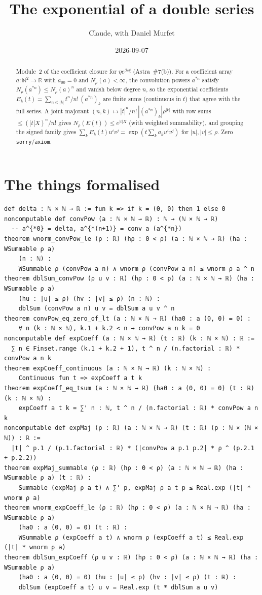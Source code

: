 \documentclass[11pt]{article}
\title{The exponential of a double series}
\author{Claude, with Daniel Murfet}
\date{2026-09-07}
\begin{document}
\maketitle
\sloppy

\begin{abstract}
Module~2 of the coefficient closure for $\eta e^{\beta s\xi}$ (Astra~\#7(b)). For a coefficient
array $a:\mathbb N^2\to\mathbb R$ with $a_{00}=0$ and $N_\rho(a)<\infty$, the convolution powers
$a^{*n}$ satisfy $N_\rho(a^{*n})\le N_\rho(a)^n$ and vanish below degree $n$, so the exponential
coefficients $E_k(t)=\sum_{n\le|k|}t^n/n!\,(a^{*n})_k$ are finite sums (continuous in $t$) that agree
with the full series. A joint majorant $(n,k)\mapsto|t|^n/n!\,|(a^{*n})_k|\rho^{|k|}$ with row sums
$\le(|t|X)^n/n!$ gives $N_\rho(E(t))\le e^{|t|X}$ (with weighted summability), and grouping the signed
family gives $\sum_kE_k(t)u^iv^j=\exp(t\sum_ka_ku^iv^j)$ for $|u|,|v|\le\rho$. Zero
\texttt{sorry}/\texttt{axiom}.
\end{abstract}

\section{The things formalised}
{\small
\begin{verbatim}
def delta : ℕ × ℕ → ℝ := fun k => if k = (0, 0) then 1 else 0
noncomputable def convPow (a : ℕ × ℕ → ℝ) : ℕ → (ℕ × ℕ → ℝ)
  -- a^{*0} = delta, a^{*(n+1)} = conv a (a^{*n})
theorem wnorm_convPow_le (ρ : ℝ) (hρ : 0 < ρ) (a : ℕ × ℕ → ℝ) (ha : WSummable ρ a)
    (n : ℕ) :
    WSummable ρ (convPow a n) ∧ wnorm ρ (convPow a n) ≤ wnorm ρ a ^ n
theorem dblSum_convPow (ρ u v : ℝ) (hρ : 0 < ρ) (a : ℕ × ℕ → ℝ) (ha : WSummable ρ a)
    (hu : |u| ≤ ρ) (hv : |v| ≤ ρ) (n : ℕ) :
    dblSum (convPow a n) u v = dblSum a u v ^ n
theorem convPow_eq_zero_of_lt (a : ℕ × ℕ → ℝ) (ha0 : a (0, 0) = 0) :
    ∀ n (k : ℕ × ℕ), k.1 + k.2 < n → convPow a n k = 0
noncomputable def expCoeff (a : ℕ × ℕ → ℝ) (t : ℝ) (k : ℕ × ℕ) : ℝ :=
  ∑ n ∈ Finset.range (k.1 + k.2 + 1), t ^ n / (n.factorial : ℝ) * convPow a n k
theorem expCoeff_continuous (a : ℕ × ℕ → ℝ) (k : ℕ × ℕ) :
    Continuous fun t => expCoeff a t k
theorem expCoeff_eq_tsum (a : ℕ × ℕ → ℝ) (ha0 : a (0, 0) = 0) (t : ℝ) (k : ℕ × ℕ) :
    expCoeff a t k = ∑' n : ℕ, t ^ n / (n.factorial : ℝ) * convPow a n k
noncomputable def expMaj (ρ : ℝ) (a : ℕ × ℕ → ℝ) (t : ℝ) (p : ℕ × (ℕ × ℕ)) : ℝ :=
  |t| ^ p.1 / (p.1.factorial : ℝ) * (|convPow a p.1 p.2| * ρ ^ (p.2.1 + p.2.2))
theorem expMaj_summable (ρ : ℝ) (hρ : 0 < ρ) (a : ℕ × ℕ → ℝ) (ha : WSummable ρ a) (t : ℝ) :
    Summable (expMaj ρ a t) ∧ ∑' p, expMaj ρ a t p ≤ Real.exp (|t| * wnorm ρ a)
theorem wnorm_expCoeff_le (ρ : ℝ) (hρ : 0 < ρ) (a : ℕ × ℕ → ℝ) (ha : WSummable ρ a)
    (ha0 : a (0, 0) = 0) (t : ℝ) :
    WSummable ρ (expCoeff a t) ∧ wnorm ρ (expCoeff a t) ≤ Real.exp (|t| * wnorm ρ a)
theorem dblSum_expCoeff (ρ u v : ℝ) (hρ : 0 < ρ) (a : ℕ × ℕ → ℝ) (ha : WSummable ρ a)
    (ha0 : a (0, 0) = 0) (hu : |u| ≤ ρ) (hv : |v| ≤ ρ) (t : ℝ) :
    dblSum (expCoeff a t) u v = Real.exp (t * dblSum a u v)
\end{verbatim}
}
\end{document}
